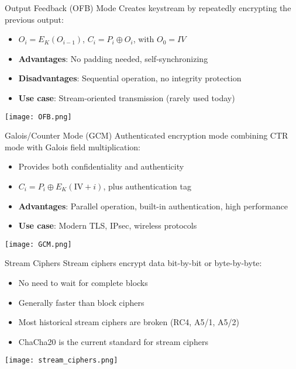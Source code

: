 \begin{definition}{Output Feedback (OFB) Mode}
Creates keystream by repeatedly encrypting the previous output:
\begin{itemize}
    \item \normalsize $O_i = E_K(O_{i-1})$, $C_i = P_i \oplus O_i$, with $O_0 = IV$ \small
    \item \textbf{Advantages}: No padding needed, self-synchronizing
    \item \textbf{Disadvantages}: Sequential operation, no integrity protection
    \item \textbf{Use case}: Stream-oriented transmission (rarely used today)
\end{itemize}
\texttt{[image: OFB.png]}
\end{definition}

\begin{definition}{Galois/Counter Mode (GCM)}
Authenticated encryption mode combining CTR mode with Galois field multiplication:
\begin{itemize}
    \item Provides both confidentiality and authenticity
    \item \normalsize $C_i = P_i \oplus E_K(\text{IV} + i)$, plus authentication tag \small
    \item \textbf{Advantages}: Parallel operation, built-in authentication, high performance
    \item \textbf{Use case}: Modern TLS, IPsec, wireless protocols
\end{itemize}
\texttt{[image: GCM.png]}
\end{definition}

\begin{concept}{Stream Ciphers}
    Stream ciphers encrypt data bit-by-bit or byte-by-byte:
    \begin{itemize}
        \item No need to wait for complete blocks
        \item Generally faster than block ciphers
        \item Most historical stream ciphers are broken (RC4, A5/1, A5/2)
        \item ChaCha20 is the current standard for stream ciphers
    \end{itemize}
    \texttt{[image: stream\_ciphers.png]}
\end{concept}

\multend

